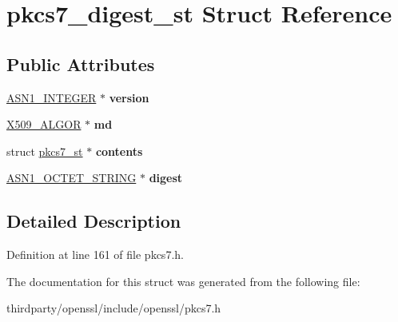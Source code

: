 \hypertarget{structpkcs7__digest__st}{}\section{pkcs7\+\_\+digest\+\_\+st Struct Reference}
\label{structpkcs7__digest__st}
\subsection*{Public Attributes}
\begin{DoxyCompactItemize}
\item 
\mbox{\label{structpkcs7__digest__st_ad46797a922e60a6fc3a30e0e694dd7d4}} 
\hyperlink{structasn1__string__st}{A\+S\+N1\+\_\+\+I\+N\+T\+E\+G\+ER} $\ast$ {\bfseries version}
\item 
\mbox{\label{structpkcs7__digest__st_a76481d96de4d0f8457fe75c6d29131e6}} 
\hyperlink{struct_x509__algor__st}{X509\+\_\+\+A\+L\+G\+OR} $\ast$ {\bfseries md}
\item 
\mbox{\label{structpkcs7__digest__st_ac519ce261ee599eaacd0ac4f2f06ebe7}} 
struct \hyperlink{structpkcs7__st}{pkcs7\+\_\+st} $\ast$ {\bfseries contents}
\item 
\mbox{\label{structpkcs7__digest__st_ad75a037194fd4d99c1a5aa180a8e96e8}} 
\hyperlink{structasn1__string__st}{A\+S\+N1\+\_\+\+O\+C\+T\+E\+T\+\_\+\+S\+T\+R\+I\+NG} $\ast$ {\bfseries digest}
\end{DoxyCompactItemize}


\subsection{Detailed Description}


Definition at line 161 of file pkcs7.\+h.



The documentation for this struct was generated from the following file\+:\begin{DoxyCompactItemize}
\item 
thirdparty/openssl/include/openssl/pkcs7.\+h\end{DoxyCompactItemize}
